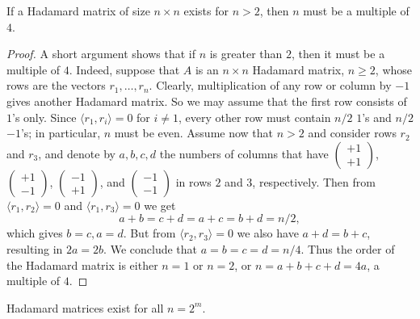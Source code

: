 \begin{theorem}
  \label{thm:hadamard_order}
  If a Hadamard matrix of size $n \times n$ exists for $n > 2$, then $n$ must be a multiple of $4$.
\end{theorem}

\begin{proof}
  A short argument shows that if $n$ is greater than $2$, then it must be a multiple of $4$.
  Indeed, suppose that $A$ is an $n \times n$ Hadamard matrix, $n \ge 2$, whose rows are the vectors $r_1, \dots, r_n$.
  Clearly, multiplication of any row or column by $-1$ gives another Hadamard matrix.
  So we may assume that the first row consists of $1$'s only.
  Since $\langle r_1, r_i \rangle = 0$ for $i \ne 1$, every other row must contain $n/2$ $1$'s and $n/2$ $-1$'s;
  in particular, $n$ must be even.
  Assume now that $n > 2$ and consider rows $r_2$ and $r_3$, and denote by $a, b, c, d$ the numbers of columns that have
  $\begin{pmatrix} +1 \\ +1 \end{pmatrix}$, $\begin{pmatrix} +1 \\ -1 \end{pmatrix}$, $\begin{pmatrix} -1 \\ +1 \end{pmatrix}$, and $\begin{pmatrix} -1 \\ -1 \end{pmatrix}$
  in rows $2$ and $3$, respectively.
  Then from $\langle r_1, r_2 \rangle = 0$ and $\langle r_1, r_3 \rangle = 0$ we get
  \[
  a+b = c+d = a+c = b+d = n/2,
  \]
  which gives $b = c, a = d$.
  But from $\langle r_2, r_3 \rangle = 0$ we also have $a+d = b+c$, resulting in $2a = 2b$.
  We conclude that $a = b = c = d = n/4$.
  Thus the order of the Hadamard matrix is either $n = 1$ or $n = 2$, or $n = a+b+c+d = 4a$, a multiple of $4$.
\end{proof}


\begin{theorem}
  \label{thm:hadamard_existence}
  \leanok
  Hadamard matrices exist for all $n = 2^m$.
\end{theorem}

